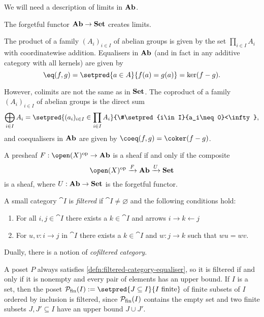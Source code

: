 \documentclass[../main.tex]{subfiles}
\begin{document}
We will need a description of limits in $\mathbf{Ab}$. 

\begin{lem}[name={\cite[Section~\RN{5}.1]{MacLaneMoerdijkSheavesGeometryLogic}}]
    The forgetful functor $\mathbf{Ab}\to \mathbf{Set}$ creates limits.
\end{lem}

\begin{exmp}
The product of a family \((A_i)_{i\in I}\) of abelian groups is given by the set $\prod_{i\in I} A_i$ with coordinatewise addition.
Equalisers in $\mathbf{Ab}$ (and in fact in any additive category with all kernels) are given by
\[\eq(f,g) = \setpred{a\in A}{f(a) = g(a)} = \ker(f-g)\text{.}\] 

However, colimits are not the same as in $\mathbf{Set}$.
The coproduct of a family \((A_i)_{i\in I}\) of abelian groups is the direct sum
\[\bigoplus_{i\in I} A_i = \setpred{(a_i)_{i\in I} \in \prod_{i\in I} A_i}{\#\setpred{i\in I}{a_i\neq 0}<\infty}\text{,}\]
and coequalisers in $\mathbf{Ab}$ are given by $\coeq(f,g) = \coker(f-g)$.
\end{exmp}

\begin{cor}\label{cor:sheaf-condition-forgetful-functor}
A presheaf $F\colon \open(X)\opp \to \catAbelianGroup$ is a sheaf if and only if the composite
\[ \open(X)\opp\xrightarrow{F} \catAbelianGroup \xrightarrow{U}\catSet \]
is a sheaf, where $U\colon \catAbelianGroup\to\catSet$ is the forgetful functor.
\end{cor}

\begin{defn}\label{defn:filtered-category}
    A small category $\cat I$ is \emph{filtered} if $\cat I\neq \varnothing$ and the following conditions hold:
    \begin{enumerate}
        \item\label{defn:filtered-category:upperbound} For all $i,j\in \cat I$ there exists a $k\in\cat I$ and arrows $i\to k \leftarrow j$
        \item\label{defn:filtered-category-equaliser} For $u,v\colon i\to j$ in $\cat I$ there exists a $k\in \cat I$ and $w\colon j\to k$ such that $wu = wv$.
    \end{enumerate}
    Dually, there is a notion of \emph{cofiltered category}.
\end{defn}

\begin{exmp}
    A poset $P$ always satisfies \cref{defn:filtered-category-equaliser}, so it is filtered if and only if it is nonempty and every pair of elements has an upper bound.
    If $I$ is a set, then the poset $\mathcal P_{\textup{fin}}(I) := \setpred{J\subseteq I}{I\text{ finite}}$ of finite subsets of \(I\) ordered by inclusion is filtered, since $\mathcal P_{\textup{fin}}(I)$ contains the empty set and two finite subsets $J, J'\subseteq I$ have an upper bound $J\cup J'$. 
\end{exmp}
\end{document}
